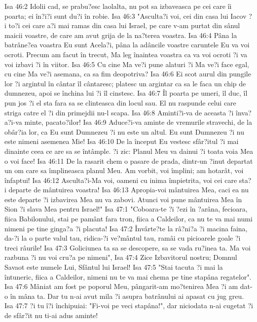 Isa 46:2  Idolii cad, se prabu?esc laolalta, nu pot sa izbaveasca pe cei care îi poarta; ei în?i?i sunt du?i în robie.
Isa 46:3  "Asculta?i voi, cei din casa lui Iacov ?i to?i cei care a?i mai ramas din casa lui Israel, pe care v-am purtat din sânul maicii voastre, de care am avut grija de la na?terea voastra.
Isa 46:4  Pâna la batrâne?ea voastra Eu sunt Acela?i, pâna la adâncile voastre caruntele Eu va voi ocroti. Precum am facut în trecut, Ma leg înaintea voastra ca va voi ocroti ?i va voi izbavi ?i în viitor.
Isa 46:5  Cu cine Ma ve?i pune alaturi ?i Ma ve?i face egal, cu cine Ma ve?i asemana, ca sa fim deopotriva?
Isa 46:6  Ei scot aurul din pungile lor ?i argintul în cântar îl cântaresc; platesc un argintar ca sa le faca un chip de dumnezeu, apoi se închina lui ?i îl cinstesc.
Isa 46:7  Îl poarta pe umeri, îl duc, îl pun jos ?i el sta fara sa se clinteasca din locul sau. El nu raspunde celui care striga catre el ?i din primejdii nu-l scapa.
Isa 46:8  Aminti?i-va de aceasta ?i înva?a?i-va minte, pacato?ilor!
Isa 46:9  Aduce?i-va aminte de vremurile stravechi, de la obâr?ia lor, ca Eu sunt Dumnezeu ?i nu este un altul. Eu sunt Dumnezeu ?i nu este nimeni asemenea Mie!
Isa 46:10  De la început Eu vestesc sfâr?itul ?i mai dinainte ceea ce are sa se întâmple. ?i zic: Planul Meu va dainui ?i toata voia Mea o voi face!
Isa 46:11  De la rasarit chem o pasare de prada, dintr-un ?inut departat un om care sa împlineasca planul Meu. Am vorbit, voi împlini; am hotarât, voi înfaptui!
Isa 46:12  Asculta?i-Ma voi, oameni cu inima împietrita, voi cei care sta?i departe de mântuirea voastra!
Isa 46:13  Apropia-voi mântuirea Mea, caci ea nu este departe ?i izbavirea Mea nu va zabovi. Atunci voi pune mântuirea Mea în Sion ?i slava Mea pentru Israel!"
Isa 47:1  "Coboara-te ?i ?ezi în ?arâna, fecioara, fiica Babilonului, stai pe pamânt fara tron, fiica a Caldeilor, ca nu te va mai numi nimeni pe tine ginga?a ?i placuta!
Isa 47:2  Învârte?te la râ?ni?a ?i macina faina, da-?i la o parte valul tau, ridica-?i ve?mântul tau, ramâi cu picioarele goale ?i treci râurile!
Isa 47:3  Goliciunea ta sa se descopere, sa se vada ru?inea ta. Ma voi razbuna ?i nu voi cru?a pe nimeni",
Isa 47:4  Zice Izbavitorul nostru; Domnul Savaot este numele Lui, Sfântul lui Israel!
Isa 47:5  "Stai tacuta ?i mai la întuneric, fiica a Caldeilor, nimeni nu te va mai chema pe tine stapâna regatelor".
Isa 47:6  Mâniat am fost pe poporul Meu, pângarit-am mo?tenirea Mea ?i am dat-o în mâna ta. Dar tu n-ai avut mila ?i asupra batrânului ai apasat cu jug greu.
Isa 47:7  ?i tu î?i închipuiai: "Fi-voi pe veci stapâna!", dar niciodata n-ai cugetat ?i de sfâr?it nu ti-ai adus aminte!
